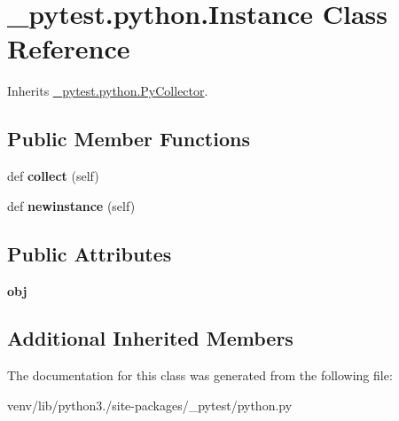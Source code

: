 \hypertarget{class__pytest_1_1python_1_1_instance}{}\section{\+\_\+pytest.\+python.\+Instance Class Reference}
\label{class__pytest_1_1python_1_1_instance}


Inherits \hyperlink{class__pytest_1_1python_1_1_py_collector}{\+\_\+pytest.\+python.\+Py\+Collector}.

\subsection*{Public Member Functions}
\begin{DoxyCompactItemize}
\item 
\mbox{\label{class__pytest_1_1python_1_1_instance_aa5a8554efbbb86e6f5b9b46a195c15d0}} 
def {\bfseries collect} (self)
\item 
\mbox{\label{class__pytest_1_1python_1_1_instance_ac5a9ec9b973b6c877c7d5a1cc39620ed}} 
def {\bfseries newinstance} (self)
\end{DoxyCompactItemize}
\subsection*{Public Attributes}
\begin{DoxyCompactItemize}
\item 
\mbox{\label{class__pytest_1_1python_1_1_instance_a6a48e700f2adb972f6577a13622b1b11}} 
{\bfseries obj}
\end{DoxyCompactItemize}
\subsection*{Additional Inherited Members}


The documentation for this class was generated from the following file\+:\begin{DoxyCompactItemize}
\item 
venv/lib/python3./site-\/packages/\+\_\+pytest/python.\+py\end{DoxyCompactItemize}
